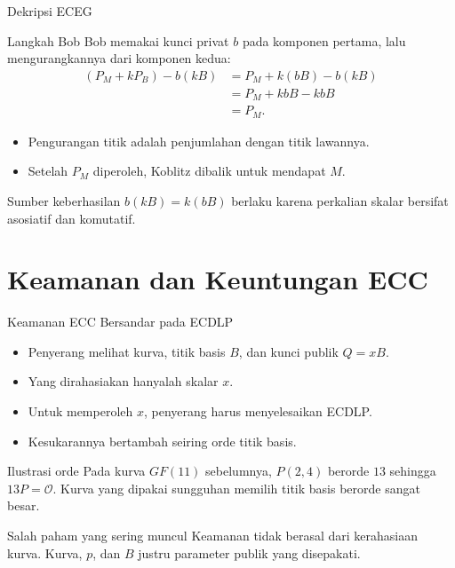 \documentclass[aspectratio=169,11pt]{beamer}
\begin{document}
\begin{frame}{Dekripsi ECEG}
    \begin{block}{Langkah Bob}
        \footnotesize
        Bob memakai kunci privat $b$ pada komponen pertama, lalu
        mengurangkannya dari komponen kedua:
        \[
        \begin{aligned}
            (P_M + kP_B) - b(kB)
                &= P_M + k(bB) - b(kB) \\
                &= P_M + kbB - kbB \\
                &= P_M .
        \end{aligned}
        \]
    \end{block}
    \vspace{0.05cm}
    \begin{itemize}
        \item Pengurangan titik adalah penjumlahan dengan titik lawannya.
        \item Setelah $P_M$ diperoleh, Koblitz dibalik untuk mendapat $M$.
    \end{itemize}
    \begin{exampleblock}{Sumber keberhasilan}
        \footnotesize
        $b(kB) = k(bB)$ berlaku karena perkalian skalar bersifat asosiatif
        dan komutatif.
    \end{exampleblock}
\end{frame}

\section{Keamanan dan Keuntungan ECC}

\begin{frame}{Keamanan ECC Bersandar pada ECDLP}
    \begin{itemize}
        \item Penyerang melihat kurva, titik basis $B$, dan kunci publik
              $Q = xB$.
        \item Yang dirahasiakan hanyalah skalar $x$.
        \item Untuk memperoleh $x$, penyerang harus menyelesaikan ECDLP.
        \item Kesukarannya bertambah seiring orde titik basis.
    \end{itemize}
    \begin{exampleblock}{Ilustrasi orde}
        \footnotesize
        Pada kurva $GF(11)$ sebelumnya, $P(2,4)$ berorde $13$ sehingga
        $13P = \mathcal{O}$. Kurva yang dipakai sungguhan memilih titik
        basis berorde sangat besar.
    \end{exampleblock}
    \begin{alertblock}{Salah paham yang sering muncul}
        \footnotesize
        Keamanan tidak berasal dari kerahasiaan kurva. Kurva, $p$, dan $B$
        justru parameter publik yang disepakati.
    \end{alertblock}
\end{frame}
\end{document}
